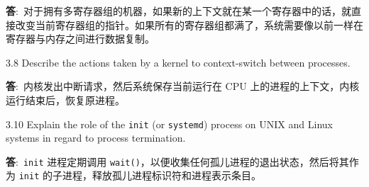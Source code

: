 \documentclass[12pt,a4paper]{article}
\newenvironment{problems}{\begin{list}{}{\renewcommand{\makelabel}[1]{\textbf{##1}\hfil}}}{\end{list}}
\providecommand{\ans}{\textbf{答}:~}
\begin{document}
\begin{problems}
    \ans 对于拥有多寄存器组的机器，如果新的上下文就在某一个寄存器中的话，就直接改变当前寄存器组的指针。如果所有的寄存器组都满了，系统需要像以前一样在寄存器与内存之间进行数据复制。
    \item[3.8] Describe the actions taken by a kernel to context-switch between processes.
    
    \ans 内核发出中断请求，然后系统保存当前运行在 CPU 上的进程的上下文，内核运行结束后，恢复原进程。
    \item[3.10] Explain the role of the \texttt{init} (or \texttt{systemd}) process on UNIX and Linux
    systems in regard to process termination.

    \ans \texttt{init} 进程定期调用 \texttt{wait()}，以便收集任何孤儿进程的退出状态，然后将其作为 \texttt{init} 的子进程，释放孤儿进程标识符和进程表示条目。
\end{problems}


    

\end{document}

